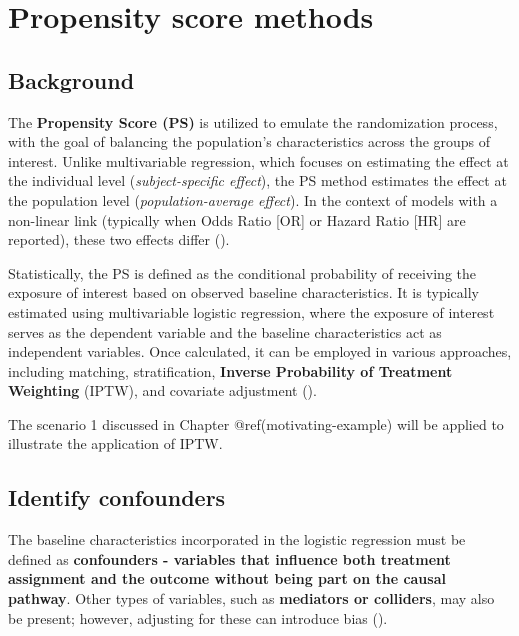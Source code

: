 \documentclass[
]{book}
\begin{document}
\chapter{Propensity score methods}\label{iptw-application}

\section{Background}\label{background-1}

The \textbf{Propensity Score (PS)} is utilized to emulate the
randomization process, with the goal of balancing the population's
characteristics across the groups of interest. Unlike multivariable
regression, which focuses on estimating the effect at the individual
level (\emph{subject-specific effect}), the PS method estimates the
effect at the population level (\emph{population-average effect}). In
the context of models with a non-linear link (typically when Odds Ratio
{[}OR{]} or Hazard Ratio {[}HR{]} are reported), these two effects
differ ().

Statistically, the PS is defined as the conditional probability of
receiving the exposure of interest based on observed baseline
characteristics. It is typically estimated using multivariable logistic
regression, where the exposure of interest serves as the dependent
variable and the baseline characteristics act as independent variables.
Once calculated, it can be employed in various approaches, including
matching, stratification, \textbf{Inverse Probability of Treatment
Weighting} (IPTW), and covariate adjustment
().

The scenario 1 discussed in Chapter @ref(motivating-example) will be
applied to illustrate the application of IPTW.

\section{Identify confounders}\label{identify-confounders}

The baseline characteristics incorporated in the logistic regression
must be defined as \textbf{confounders - variables that influence both
treatment assignment and the outcome without being part on the causal
pathway}. Other types of variables, such as \textbf{mediators or
colliders}, may also be present; however, adjusting for these can
introduce bias ().
\end{document}
